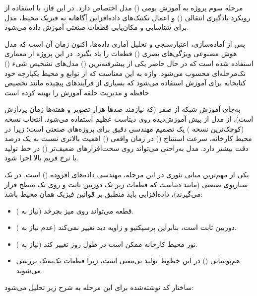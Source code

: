 \documentclass{article}
\begin{document}
مرحله سوم پروژه به آموزش بومی () مدل  اختصاص دارد. در این فاز، با استفاده از رویکرد یادگیری انتقالی () و اعمال تکنیک‌های داده‌افزایی آگاهانه به فیزیک محیط، مدل برای شناسایی و مکان‌یابی قطعات صنعتی آموزش داده می‌شود.

پس از آماده‌سازی، اعتبارسنجی و تحلیل آماری داده‌ها، اکنون زمان آن است که مدل هوش مصنوعی ویژگی‌های بصری () قطعات را یاد بگیرد. در این پروژه از معماری  استفاده شده است که در حال حاضر یکی از پیشرفته‌ترین () مدل‌های تشخیص شیء () تک‌مرحله‌ای محسوب می‌شود. واژه  به این معناست که از توابع و محیط یکپارچه خود کتابخانه  برای آموزش استفاده می‌شود که بسیاری از فرآیندهای پیچیده مانند تخصیص حافظه و مدیریت حلقه آموزش را بهینه کرده است.

به‌جای آموزش شبکه از صفر (که نیازمند صدها هزار تصویر و هفته‌ها زمان پردازش است)، از مدل از پیش آموزش‌دیده روی دیتاست عظیم  استفاده می‌شود. انتخاب نسخه  (کوچک‌ترین نسخه ) یک تصمیم مهندسی دقیق برای پروژه‌های صنعتی است؛ زیرا در محیط کارخانه، سرعت استنتاج () در زمان واقعی () اهمیت بالاتری نسبت به یک درصد دقت بیشتر دارد. مدل  به‌راحتی می‌تواند روی سخت‌افزارهای ضعیف‌تر () در خط تولید با نرخ فریم بالا اجرا شود.

یکی از مهم‌ترین مبانی تئوری در این مرحله، مهندسی داده‌های افزوده () است. در یک سناریوی صنعتی (مانند دیتاست  که قطعات زیر یک دوربین ثابت و روی یک سطح قرار می‌گیرند)، داده‌افزایی باید منطبق بر قوانین فیزیک همان محیط باشد:

\begin{itemize}
	\item قطعه می‌تواند روی میز بچرخد (نیاز به ).
	\item دوربین ثابت است، بنابراین پرسپکتیو و زاویه دید تغییر نمی‌کند (عدم نیاز به ).
	\item نور محیط کارخانه ممکن است در طول روز تغییر کند (نیاز به ).
	\item هم‌پوشانی () در این خطوط تولید بی‌معنی است، زیرا قطعات تک‌به‌تک بررسی می‌شوند.
\end{itemize}


ساختار کد نوشته‌شده برای این مرحله به شرح زیر تحلیل می‌شود:
\end{document}
